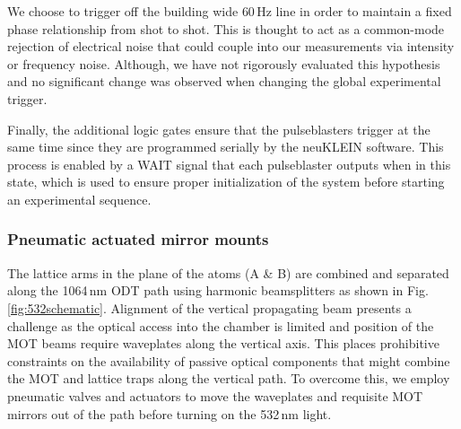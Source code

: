 We choose to trigger off the building wide $60$\,Hz line in order to maintain a fixed phase relationship from shot to shot.
This is thought to act as a common-mode rejection of electrical noise that could couple into our measurements via intensity or frequency noise.
Although, we have not rigorously evaluated this hypothesis and no significant change was observed when changing the global experimental trigger.

Finally, the additional logic gates ensure that the pulseblasters trigger at the same time since they are programmed serially by the neuKLEIN software.
This process is enabled by a WAIT signal that each pulseblaster outputs when in this state, which is used to ensure proper initialization of the system before starting an experimental sequence.

\subsubsection{Pneumatic actuated mirror mounts}
The lattice arms in the plane of the atoms (A \& B) are combined and separated along the 1064\,nm ODT path using harmonic beamsplitters as shown in Fig.\,\ref{fig:532schematic}.
Alignment of the vertical propagating beam presents a challenge as the optical access into the chamber is limited and position of the MOT beams require waveplates along the vertical axis. %
This places prohibitive constraints on the availability of passive optical components that might combine the MOT and lattice traps along the vertical path.
To overcome this, we employ pneumatic valves and actuators to move the waveplates and requisite MOT mirrors out of the path before turning on the 532\,nm light.

